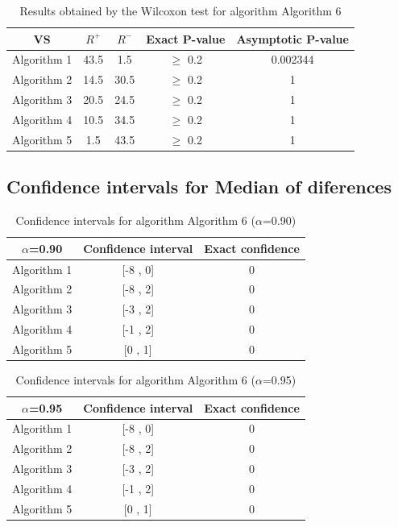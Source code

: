 \documentclass[a4paper,10pt]{article}
\begin{document}
\begin{table}[!htp]
\centering\small
\begin{tabular}{
|c|c|c|c|c|}
\hline
 VS & $R^{+}$ & $R^{-}$ & Exact P-value & Asymptotic P-value \\ \hline 
Algorithm 1 & 43.5 & 1.5 & $\geq$ 0.2 & 0.002344\\ \hline 
Algorithm 2 & 14.5 & 30.5 & $\geq$ 0.2 & 1\\ \hline 
Algorithm 3 & 20.5 & 24.5 & $\geq$ 0.2 & 1\\ \hline 
Algorithm 4 & 10.5 & 34.5 & $\geq$ 0.2 & 1\\ \hline 
Algorithm 5 & 1.5 & 43.5 & $\geq$ 0.2 & 1\\ \hline 

\end{tabular}
\caption{Results obtained by the Wilcoxon test for algorithm Algorithm 6}
\end{table}

\subsection{Confidence intervals for Median of diferences}

\begin{table}[!htp]
\centering\small
\begin{tabular}{
|c|c|c|}
\hline
 $\alpha$=0.90 & Confidence interval & Exact confidence \\ \hline 
Algorithm 1 & [-8 , 0] & 0\\ \hline 
Algorithm 2 & [-8 , 2] & 0\\ \hline 
Algorithm 3 & [-3 , 2] & 0\\ \hline 
Algorithm 4 & [-1 , 2] & 0\\ \hline 
Algorithm 5 & [0 , 1] & 0\\ \hline 

\end{tabular}
\caption{Confidence intervals for algorithm Algorithm 6 ($\alpha$=0.90)}
\end{table}
\begin{table}[!htp]
\centering\small
\begin{tabular}{
|c|c|c|}
\hline
 $\alpha$=0.95 & Confidence interval & Exact confidence \\ \hline 
Algorithm 1 & [-8 , 0] & 0\\ \hline 
Algorithm 2 & [-8 , 2] & 0\\ \hline 
Algorithm 3 & [-3 , 2] & 0\\ \hline 
Algorithm 4 & [-1 , 2] & 0\\ \hline 
Algorithm 5 & [0 , 1] & 0\\ \hline 

\end{tabular}
\caption{Confidence intervals for algorithm Algorithm 6 ($\alpha$=0.95)}
\end{table}

 \clearpage 
\end{document}

